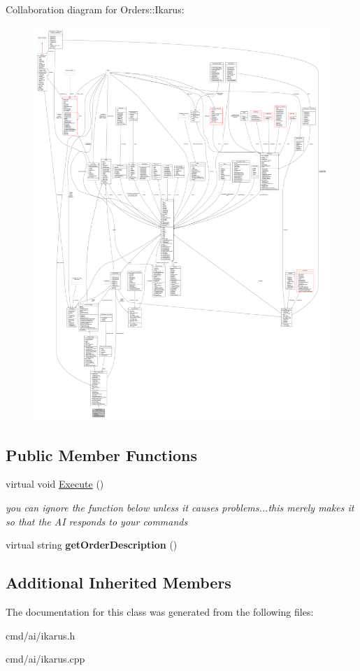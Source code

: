 Collaboration diagram for Orders\+:\+:Ikarus\+:
\nopagebreak
\begin{figure}[H]
\begin{center}
\leavevmode
\includegraphics[width=350pt]{d1/d0c/classOrders_1_1Ikarus__coll__graph}
\end{center}
\end{figure}
\subsection*{Public Member Functions}
\begin{DoxyCompactItemize}
\item 
virtual void \hyperlink{classOrders_1_1Ikarus_a206f939ae6b30cdd7e45b05288609610}{Execute} ()\hypertarget{classOrders_1_1Ikarus_a206f939ae6b30cdd7e45b05288609610}{}\label{classOrders_1_1Ikarus_a206f939ae6b30cdd7e45b05288609610}

\begin{DoxyCompactList}\small\item\em you can ignore the function below unless it causes problems...this merely makes it so that the AI responds to your commands \end{DoxyCompactList}\item 
virtual string {\bfseries get\+Order\+Description} ()\hypertarget{classOrders_1_1Ikarus_a5fa9907ad205fdb8e39cfef6de943267}{}\label{classOrders_1_1Ikarus_a5fa9907ad205fdb8e39cfef6de943267}

\end{DoxyCompactItemize}
\subsection*{Additional Inherited Members}


The documentation for this class was generated from the following files\+:\begin{DoxyCompactItemize}
\item 
cmd/ai/ikarus.\+h\item 
cmd/ai/ikarus.\+cpp\end{DoxyCompactItemize}
